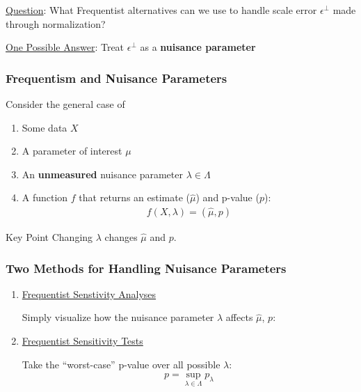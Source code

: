 \documentclass[11pt,t]{beamer}
\begin{document}
\begin{frame}
  \begin{center}
    \underline{Question}:
    What Frequentist alternatives can we use to handle scale error \(\epsilon^\perp\) made through normalization?
  \end{center}
  \begin{center}
    \underline{One Possible Answer}:
    Treat \(\epsilon^\perp\) as a \textbf{nuisance parameter}
  \end{center}
\end{frame}

\begin{frame}
  \frametitle{Frequentism and Nuisance Parameters}
  Consider the general case of
  \begin{enumerate}
    \item Some data \(X\)
    \item A parameter of interest \(\mu\)
    \item An \textbf{unmeasured} nuisance parameter \(\lambda \in \Lambda\)
    \item A function \(f\) that returns an estimate (\(\hat{\mu}\)) and p-value (\(p\)):
      \begin{align*}
        f(X, \lambda) = (\hat{\mu}, p)
      \end{align*}
  \end{enumerate}
  \begin{block}{Key Point}
    Changing \(\lambda\) changes \(\hat{\mu}\) and \(p\).
  \end{block}
\end{frame}

\begin{frame}
  \frametitle{Two Methods for Handling Nuisance Parameters}
  \begin{enumerate}
  \item \underline{Frequentist Senstivity Analyses}
    \vspace{5px}
    
    Simply visualize how the nuisance parameter \(\lambda\) affects \(\hat{\mu}\), \(p\):
    
    \pause
  \item \underline{Frequentist Sensitivity Tests}
    \vspace{5px}
    
      Take the ``worst-case'' p-value over all possible \(\lambda\):
      \begin{align*}
        p = \sup_{\lambda \in \Lambda} p_{\lambda}
      \end{align*}
    
  \end{enumerate}
\end{frame}
  
\end{document}
